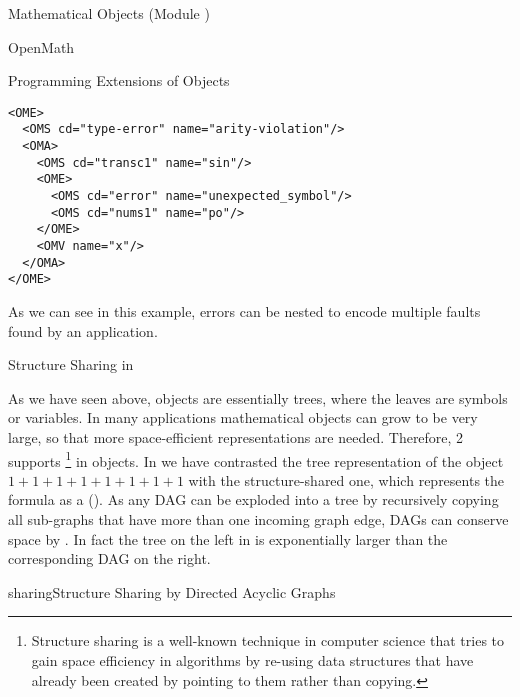 \begin{tchapter}[id=mobj,short=Mathematical Objects]{Mathematical Objects (Module {})}
\begin{tsection}[id=openmath]{OpenMath}
\begin{tsubsection}[id=om:error]{Programming Extensions of {\openmath} Objects}
\begin{lstlisting}[label=ome,language=OpenMath,numbers=none,index={OME}]
<OME>
  <OMS cd="type-error" name="arity-violation"/>
  <OMA>
    <OMS cd="transc1" name="sin"/>
    <OME>
      <OMS cd="error" name="unexpected_symbol"/>
      <OMS cd="nums1" name="po"/>
    </OME>
    <OMV name="x"/>
  </OMA>
</OME>
\end{lstlisting}
  As we can see in this example, errors can be nested to encode multiple faults found by
  an {\openmath} application.
\end{tsubsection}

\begin{tsubsection}[id=om:structure-sharing]{Structure Sharing in {\openmath}}

  As we have seen above, {\openmath} objects are essentially trees, where the leaves are
  symbols or variables. In many applications mathematical objects can grow to be very
  large, so that more space-efficient representations are needed. Therefore, {\openmath}2
  supports {}\footnote{Structure sharing is a well-known
    technique in computer science that tries to gain space efficiency in algorithms by
    re-using data structures that have already been created by pointing to them rather
    than copying.} in {\openmath} objects. In {} we have contrasted the
  tree representation of the object $1+1+1+1+1+1+1+1$ with the structure-shared one, which
  represents the formula as a {} (). As
  any DAG can be exploded into a tree by recursively copying all
  sub-graphs that have more than one incoming graph edge, DAGs can conserve space by
  {}. In fact the tree on the left in {} is
  exponentially larger than the corresponding DAG on the right.

\begin{myfig}{sharing}{Structure Sharing by Directed Acyclic Graphs}
\end{myfig}
\end{tsubsection}
\end{tsection}
\end{tchapter}
